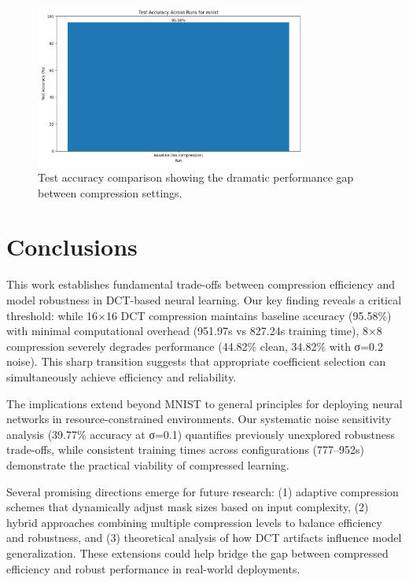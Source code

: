 \documentclass{article} %
\begin{document}
\begin{figure}[h]
    \centering
    \includegraphics[width=0.8\textwidth]{test_accuracy_mnist_across_runs.png}
    \caption{Test accuracy comparison showing the dramatic performance gap between compression settings.}
    \label{fig:test-accuracy}
\end{figure}

\section{Conclusions}
\label{sec:conclusion}

This work establishes fundamental trade-offs between compression efficiency and model robustness in DCT-based neural learning. Our key finding reveals a critical threshold: while 16×16 DCT compression maintains baseline accuracy (95.58\%) with minimal computational overhead (951.97s vs 827.24s training time), 8×8 compression severely degrades performance (44.82\% clean, 34.82\% with σ=0.2 noise). This sharp transition suggests that appropriate coefficient selection can simultaneously achieve efficiency and reliability.

The implications extend beyond MNIST to general principles for deploying neural networks in resource-constrained environments. Our systematic noise sensitivity analysis (39.77\% accuracy at σ=0.1) quantifies previously unexplored robustness trade-offs, while consistent training times across configurations (777--952s) demonstrate the practical viability of compressed learning.

Several promising directions emerge for future research: (1) adaptive compression schemes that dynamically adjust mask sizes based on input complexity, (2) hybrid approaches combining multiple compression levels to balance efficiency and robustness, and (3) theoretical analysis of how DCT artifacts influence model generalization. These extensions could help bridge the gap between compressed efficiency and robust performance in real-world deployments.



\end{document}
